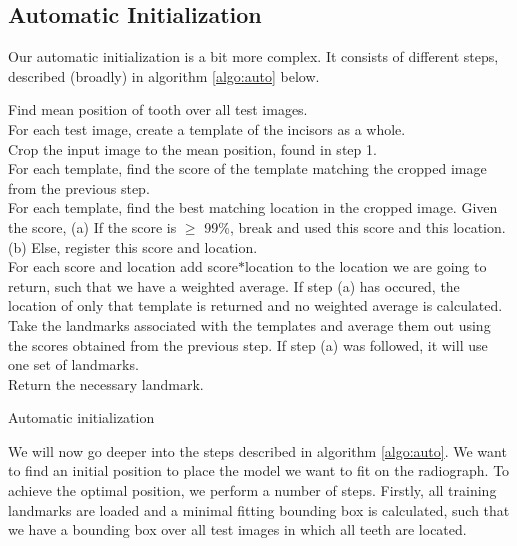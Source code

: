 \documentclass[11pt]{article}
\begin{document}
\subsection{Automatic Initialization}
Our automatic initialization is a bit more complex. It consists of different steps, described (broadly) in algorithm \ref{algo:auto} below.
\newline
\begin{algorithm}[H]
\hspace{0.4mm} Find mean position of tooth over all test images.\\
\hspace{0.4mm} For each test image, create a template of the incisors as a whole.\\
\hspace{0.4mm} Crop the input image to the mean position, found in step 1.\\
\hspace{0.4mm} For each template, find the score of the template matching the cropped image from the previous step.\\
\hspace{0.4mm} For each template, find the best matching location in the cropped image.
Given the score,\linebreak
\hspace{0.4mm} (a) If the score is $\geq$ 99\%, break and used this score and this location.\linebreak
\hspace{0.4mm} (b) Else, register this score and location.\\
\hspace{0.4mm} For each score and location add score$*$location to the location we are going to return, such that we have a weighted average. If step (a) has occured, the location of only that template is returned and no weighted average is calculated.\\
\hspace{0.4mm} Take the landmarks associated with the templates and average them out using the scores obtained from the previous step. If step (a) was followed, it will use one set of landmarks.\\
\hspace{0.4mm} Return the necessary landmark.
\caption{Automatic initialization}
\label{algo:auto}
\end{algorithm}
\vspace*{3mm}
\noindent We will now go deeper into the steps described in algorithm \ref{algo:auto}. We want to find an initial position to place the model we want to fit on the radiograph. To achieve the optimal position, we perform a number of steps. Firstly, all training landmarks are loaded and a minimal fitting bounding box is calculated, such that we have a bounding box over all test images in which all teeth are located. \\
\end{document}
